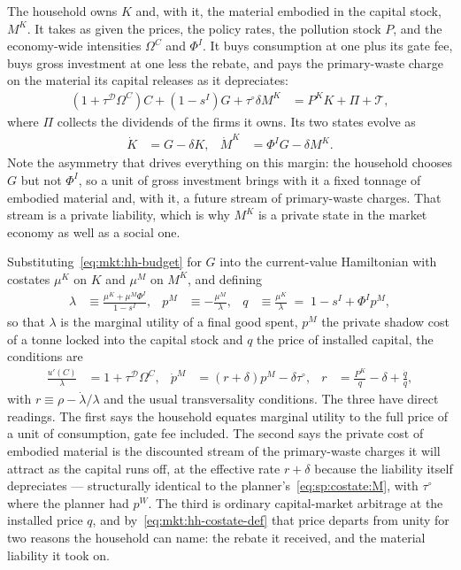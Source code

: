 The household owns $K$ and, with it, the material embodied in the capital stock, $M^K$. It takes as
given the prices, the policy rates, the pollution stock $P$, and the economy-wide intensities
$\Omega^C$ and $\Phi^I$. It buys consumption at one plus its gate fee, buys gross investment at one
less the rebate, and pays the primary-waste charge on the material its capital releases as it
depreciates:
\begin{align}
\left(1+\tau^{\mathcal D}\Omega^C\right)C+\left(1-s^I\right)G+\tau^{\circ}\delta M^K
&= P^KK+\Pi+\mathcal T,
\label{eq:mkt:hh-budget}
\end{align}
where $\Pi$ collects the dividends of the firms it owns. Its two states evolve as
\begin{align}
\dot K &= G-\delta K,
&
\dot M^K &= \Phi^IG-\delta M^K .
\label{eq:mkt:hh-states}
\end{align}
Note the asymmetry that drives everything on this margin: the household chooses $G$ but not $\Phi^I$,
so a unit of gross investment brings with it a fixed tonnage of embodied material and, with it, a
future stream of primary-waste charges. That stream is a private liability, which is why $M^K$ is a
private state in the market economy as well as a social one.

Substituting~\eqref{eq:mkt:hh-budget} for $G$ into the current-value Hamiltonian with costates $\mu^K$
on $K$ and $\mu^M$ on $M^K$, and defining
\begin{align}
\lambda &\equiv \frac{\mu^K+\mu^M\Phi^I}{1-s^I},
&
p^M &\equiv -\frac{\mu^M}{\lambda},
&
q &\equiv \frac{\mu^K}{\lambda}\;=\;1-s^I+\Phi^Ip^M,
\label{eq:mkt:hh-costate-def}
\end{align}
so that $\lambda$ is the marginal utility of a final good spent, $p^M$ the private shadow cost of a
tonne locked into the capital stock and $q$ the price of installed capital, the conditions are
\begin{align}
\frac{u'\left(C\right)}{\lambda} &= 1+\tau^{\mathcal D}\Omega^C,
&
\dot p^M &= \left(r+\delta\right)p^M-\delta\tau^{\circ},
&
r &= \frac{P^K}{q}-\delta+\frac{\dot q}{q},
\label{eq:mkt:hh-foc}
\end{align}
with $r\equiv\rho-\dot\lambda/\lambda$ and the usual transversality conditions. The three have direct
readings. The first says the household equates marginal utility to the full price of a unit of
consumption, gate fee included. The second says the private cost of embodied material is the
discounted stream of the primary-waste charges it will attract as the capital runs off, at the
effective rate $r+\delta$ because the liability itself depreciates --- structurally identical to the
planner's~\eqref{eq:sp:costate:M}, with $\tau^{\circ}$ where the planner had $p^W$. The third is
ordinary capital-market arbitrage at the installed price $q$, and by~\eqref{eq:mkt:hh-costate-def} that
price departs from unity for two reasons the household can name: the rebate it received, and the
material liability it took on.

